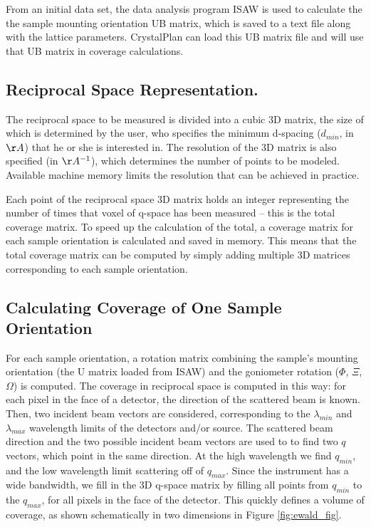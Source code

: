 \documentclass{iucr}              %
\begin{document}
From an initial data set, the data analysis program ISAW \cite{Tao2006} is used
to calculate the the sample mounting orientation UB matrix, which is saved to a text file along with the lattice
parameters. CrystalPlan can load this UB matrix file and will use that UB matrix
in coverage calculations.
   
  
\subsection{Reciprocal Space Representation.}

The reciprocal space to be measured is divided into a cubic 3D matrix, the size
of which is determined by the user, who specifies the minimum d-spacing
($d_{min}$, in $\AA$) that he or she is interested in. The resolution of the 3D
matrix is also specified (in $\AA^{-1}$), which determines the number of points to be
modeled. Available machine memory limits the resolution that can be achieved in
practice.

Each point of the reciprocal space 3D matrix holds an integer representing the 
number of times that voxel of q-space has been measured – this is the total
coverage matrix. To speed up the calculation of the total, a coverage matrix for
each sample orientation is calculated and saved in memory. This means that the
total coverage matrix can be computed by simply adding multiple 3D matrices
corresponding to each sample orientation. 
 
\subsection{Calculating Coverage of One Sample Orientation}

For each sample orientation, a rotation matrix combining the sample's mounting
orientation (the U matrix loaded from ISAW) and the goniometer rotation
($\Phi$, $\Xi$, $\Omega$) is computed. The coverage in reciprocal space is
computed in this way: for each pixel in the face of a detector, the direction of
the scattered beam is known. Then, two incident beam vectors are considered,
corresponding to the $\lambda_{min}$ and $\lambda_{max}$ wavelength limits
of the detectors and/or source. The scattered beam direction and the two possible incident beam vectors
are used to to find two $q$ vectors, which point in the same direction. At the
high wavelength we find $q_{min}$, and the low wavelength limit scattering off
of $q_{max}$. Since the instrument has a wide bandwidth, we fill in the 3D q-space
matrix by filling all points from $q_{min}$ to the $q_{max}$, for all pixels in
the face of the detector. This quickly defines a volume of coverage, as shown
schematically in two dimensions in Figure \ref{fig:ewald_fig}.
\end{document}
